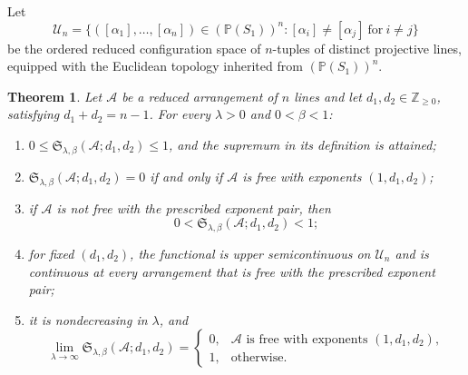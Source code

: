 \documentclass[pdflatex,sn-mathphys-num]{sn-jnl}%
\newtheorem{theorem}{Theorem}
\theoremstyle{remark}
\theoremstyle{definition}
\begin{document}
Let
\[
\mathcal U_n=
\bigl\{([\alpha_1],\ldots,[\alpha_n])\in(\mathbb P(S_1))^n:
[\alpha_i]\neq[\alpha_j]\ \text{for}\ i\neq j\bigr\}
\]
be the ordered reduced configuration space of $n$-tuples of distinct projective lines, equipped with the Euclidean topology inherited from $(\mathbb P(S_1))^n$.

\begin{theorem}
\label{thm:penalised-saito}
Let $\mathcal{A}$ be a reduced arrangement of $n$ lines and let $d_1,d_2 \in \mathbb{Z}_{\geq0}$, satisfying $d_1+d_2=n-1$. For every $\lambda>0$ and $0<\beta<1$:
\begin{enumerate}[label=(\arabic*)]
\item $0\leq\mathfrak S_{\lambda,\beta}(\mathcal{A};d_1,d_2)\leq1$, and the supremum in its definition is attained;
\item $\mathfrak S_{\lambda,\beta}(\mathcal{A};d_1,d_2)=0$ if and only if $\mathcal{A}$ is free with exponents $(1,d_1,d_2)$;
\item if $\mathcal{A}$ is not free with the prescribed exponent pair, then
\[
0<\mathfrak S_{\lambda,\beta}(\mathcal{A};d_1,d_2)<1;
\]
\item for fixed $(d_1,d_2)$, the functional is upper semicontinuous on $\mathcal U_n$ and is continuous at every arrangement that is free with the prescribed exponent pair;
\item it is nondecreasing in $\lambda$, and
\[
\lim_{\lambda\to\infty}
\mathfrak S_{\lambda,\beta}(\mathcal{A};d_1,d_2)
=
\begin{cases}
0,&\mathcal{A}\text{ is free with exponents }(1,d_1,d_2),\\
1,&\text{otherwise}.
\end{cases}
\]
\end{enumerate}
\end{theorem}
\end{document}
